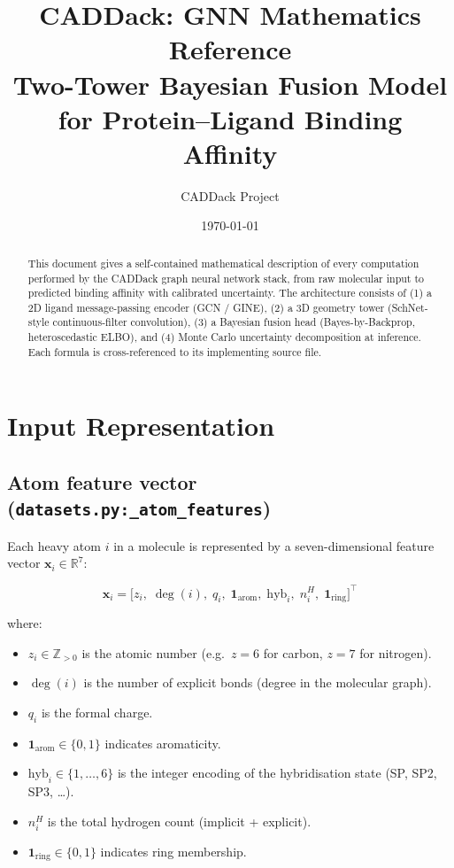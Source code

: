 \documentclass[11pt,a4paper]{article}
\title{%
  \textbf{CADDack: GNN Mathematics Reference}\\[6pt]
  \large Two-Tower Bayesian Fusion Model for Protein--Ligand Binding Affinity
}
\author{CADDack Project}
\date{\today}
\newcommand{\R}{\mathbb{R}}
\newcommand{\bx}{\mathbf{x}}
\newcommand{\code}[1]{\texttt{#1}}
\begin{document}
\maketitle
\thispagestyle{fancy}

\begin{abstract}
This document gives a self-contained mathematical description of every computation
performed by the CADDack graph neural network stack, from raw molecular input to
predicted binding affinity with calibrated uncertainty.  The architecture consists of
(1) a 2D ligand message-passing encoder (GCN / GINE), (2) a 3D geometry tower
(SchNet-style continuous-filter convolution), (3) a Bayesian fusion head
(Bayes-by-Backprop, heteroscedastic ELBO), and (4) Monte Carlo uncertainty
decomposition at inference.  Each formula is cross-referenced to its implementing
source file.
\end{abstract}

\tableofcontents
\newpage

\section{Input Representation}
\label{sec:input}

\subsection{Atom feature vector (\code{datasets.py:\_atom\_features})}

Each heavy atom $i$ in a molecule is represented by a seven-dimensional feature
vector $\bx_i \in \R^7$:

\begin{equation}
\bx_i =
\bigl[
  z_i,\;
  \deg(i),\;
  q_i,\;
  \mathbf{1}_{\mathrm{arom}},\;
  \mathrm{hyb}_i,\;
  n^H_i,\;
  \mathbf{1}_{\mathrm{ring}}
\bigr]^{\!\top}
\end{equation}

where:
\begin{itemize}
  \item $z_i \in \mathbb{Z}_{>0}$ is the atomic number (e.g.\ $z=6$ for carbon, $z=7$ for nitrogen).
  \item $\deg(i)$ is the number of explicit bonds (degree in the molecular graph).
  \item $q_i$ is the formal charge.
  \item $\mathbf{1}_{\mathrm{arom}} \in \{0,1\}$ indicates aromaticity.
  \item $\mathrm{hyb}_i \in \{1,\ldots,6\}$ is the integer encoding of the hybridisation
        state (SP, SP2, SP3, \ldots).
  \item $n^H_i$ is the total hydrogen count (implicit + explicit).
  \item $\mathbf{1}_{\mathrm{ring}} \in \{0,1\}$ indicates ring membership.
\end{itemize}
\end{document}
